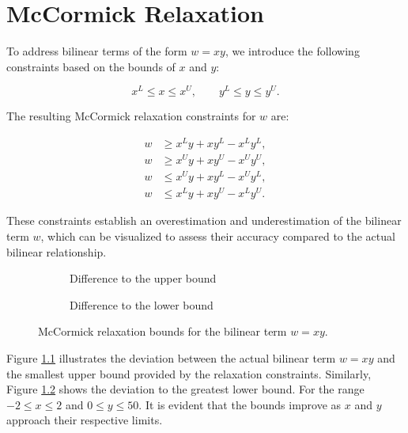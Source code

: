\chapter{McCormick Relaxation}

To address bilinear terms of the form \( w = xy \), we introduce the following constraints based on the bounds of \( x \) and \( y \):

\[ x^L \leq x \leq x^U, \qquad y^L \leq y \leq y^U.
\]

The resulting McCormick relaxation constraints for \( w \) are:

\[
	\begin{aligned}
		w & \geq x^L y + x y^L - x^L y^L, \\
		w & \geq x^U y + x y^U - x^U y^U, \\
		w & \leq x^U y + x y^L - x^U y^L, \\
		w & \leq x^L y + x y^U - x^L y^U.
	\end{aligned}
\]

These constraints establish an overestimation and underestimation of the bilinear term \( w \), which can be visualized to assess their accuracy
compared to the actual bilinear relationship.

\begin{figure}[h]
	\centering
	\begin{subfigure}[b]{0.45\textwidth}
		\centering
		\resizebox{\textwidth}{!}{}
		\caption{Difference to the upper bound}
		\label{fig:mccormick_0_upper}
	\end{subfigure}
	\hfill
	\begin{subfigure}[b]{0.45\textwidth}
		\centering
		\resizebox{\textwidth}{!}{}
		\caption{Difference to the lower bound}
		\label{fig:mccormick_0_lower}
	\end{subfigure}
	\caption{McCormick relaxation bounds for the bilinear term \( w = xy \).}
	\label{fig:mccormick_bounds_0}
\end{figure}

Figure \ref{fig:mccormick_0_upper} illustrates the deviation between the actual bilinear term \( w = xy \) and the smallest upper bound provided by
the relaxation constraints.
Similarly, Figure \ref{fig:mccormick_0_lower} shows the deviation to the greatest lower bound.
For the range \( -2 \leq x \leq 2 \) and \( 0 \leq y \leq 50 \).
It is evident that the bounds improve as \( x \) and \( y \) approach their respective limits.

